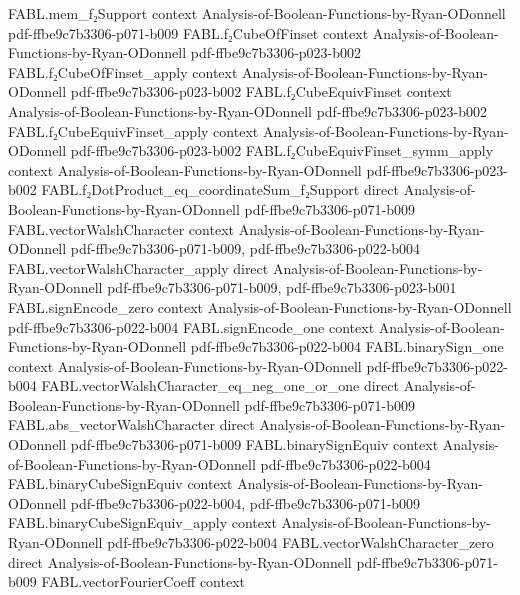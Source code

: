 \begin{theorem}
\proofstep
  {FABL.mem_f₂Support}
  {context}
  {Analysis-of-Boolean-Functions-by-Ryan-ODonnell}
  {pdf-ffbe9c7b3306-p071-b009}
\proofstep
  {FABL.f₂CubeOfFinset}
  {context}
  {Analysis-of-Boolean-Functions-by-Ryan-ODonnell}
  {pdf-ffbe9c7b3306-p023-b002}
\proofstep
  {FABL.f₂CubeOfFinset_apply}
  {context}
  {Analysis-of-Boolean-Functions-by-Ryan-ODonnell}
  {pdf-ffbe9c7b3306-p023-b002}
\proofstep
  {FABL.f₂CubeEquivFinset}
  {context}
  {Analysis-of-Boolean-Functions-by-Ryan-ODonnell}
  {pdf-ffbe9c7b3306-p023-b002}
\proofstep
  {FABL.f₂CubeEquivFinset_apply}
  {context}
  {Analysis-of-Boolean-Functions-by-Ryan-ODonnell}
  {pdf-ffbe9c7b3306-p023-b002}
\proofstep
  {FABL.f₂CubeEquivFinset_symm_apply}
  {context}
  {Analysis-of-Boolean-Functions-by-Ryan-ODonnell}
  {pdf-ffbe9c7b3306-p023-b002}
\proofstep
  {FABL.f₂DotProduct_eq_coordinateSum_f₂Support}
  {direct}
  {Analysis-of-Boolean-Functions-by-Ryan-ODonnell}
  {pdf-ffbe9c7b3306-p071-b009}
\proofstep
  {FABL.vectorWalshCharacter}
  {context}
  {Analysis-of-Boolean-Functions-by-Ryan-ODonnell}
  {pdf-ffbe9c7b3306-p071-b009,
    pdf-ffbe9c7b3306-p022-b004}
\proofstep
  {FABL.vectorWalshCharacter_apply}
  {direct}
  {Analysis-of-Boolean-Functions-by-Ryan-ODonnell}
  {pdf-ffbe9c7b3306-p071-b009,
    pdf-ffbe9c7b3306-p023-b001}
\proofstep
  {FABL.signEncode_zero}
  {context}
  {Analysis-of-Boolean-Functions-by-Ryan-ODonnell}
  {pdf-ffbe9c7b3306-p022-b004}
\proofstep
  {FABL.signEncode_one}
  {context}
  {Analysis-of-Boolean-Functions-by-Ryan-ODonnell}
  {pdf-ffbe9c7b3306-p022-b004}
\proofstep
  {FABL.binarySign_one}
  {context}
  {Analysis-of-Boolean-Functions-by-Ryan-ODonnell}
  {pdf-ffbe9c7b3306-p022-b004}
\proofstep
  {FABL.vectorWalshCharacter_eq_neg_one_or_one}
  {direct}
  {Analysis-of-Boolean-Functions-by-Ryan-ODonnell}
  {pdf-ffbe9c7b3306-p071-b009}
\proofstep
  {FABL.abs_vectorWalshCharacter}
  {direct}
  {Analysis-of-Boolean-Functions-by-Ryan-ODonnell}
  {pdf-ffbe9c7b3306-p071-b009}
\proofstep
  {FABL.binarySignEquiv}
  {context}
  {Analysis-of-Boolean-Functions-by-Ryan-ODonnell}
  {pdf-ffbe9c7b3306-p022-b004}
\proofstep
  {FABL.binaryCubeSignEquiv}
  {context}
  {Analysis-of-Boolean-Functions-by-Ryan-ODonnell}
  {pdf-ffbe9c7b3306-p022-b004,
    pdf-ffbe9c7b3306-p071-b009}
\proofstep
  {FABL.binaryCubeSignEquiv_apply}
  {context}
  {Analysis-of-Boolean-Functions-by-Ryan-ODonnell}
  {pdf-ffbe9c7b3306-p022-b004}
\proofstep
  {FABL.vectorWalshCharacter_zero}
  {direct}
  {Analysis-of-Boolean-Functions-by-Ryan-ODonnell}
  {pdf-ffbe9c7b3306-p071-b009}
\proofstep
  {FABL.vectorFourierCoeff}
  {context}

\end{theorem}
